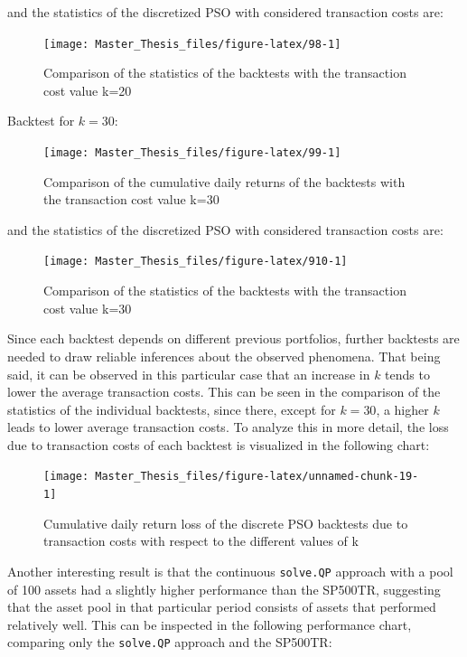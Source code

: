 \documentclass[
  oneside, a4paper, 12pt, openany]{book}
\theoremstyle{definition}
\theoremstyle{definition}
\theoremstyle{definition}
\theoremstyle{definition}
\theoremstyle{remark}
\begin{document}
and the statistics of the discretized PSO with considered transaction costs are:

\begin{figure}[H]
\texttt{[image: Master\_Thesis\_files/figure-latex/98-1]} \caption{Comparison of the statistics of the backtests with the transaction cost value k=20}\label{fig:98}
\end{figure}

Backtest for \(k=30\):

\begin{figure}[H]
\texttt{[image: Master\_Thesis\_files/figure-latex/99-1]} \caption{Comparison of the cumulative daily returns of the backtests with the transaction cost value k=30}\label{fig:99}
\end{figure}

and the statistics of the discretized PSO with considered transaction costs are:

\begin{figure}[H]
\texttt{[image: Master\_Thesis\_files/figure-latex/910-1]} \caption{Comparison of the statistics of the backtests with the transaction cost value k=30}\label{fig:910}
\end{figure}

Since each backtest depends on different previous portfolios, further backtests are needed to draw reliable inferences about the observed phenomena. That being said, it can be observed in this particular case that an increase in \(k\) tends to lower the average transaction costs. This can be seen in the comparison of the statistics of the individual backtests, since there, except for \(k=30\), a higher \(k\) leads to lower average transaction costs. To analyze this in more detail, the loss due to transaction costs of each backtest is visualized in the following chart:

\begin{figure}[H]
\texttt{[image: Master\_Thesis\_files/figure-latex/unnamed-chunk-19-1]} \caption{Cumulative daily return loss of the discrete PSO backtests due to transaction costs with respect to the different values of k}\label{fig:unnamed-chunk-19}
\end{figure}

Another interesting result is that the continuous \texttt{solve.QP} approach with a pool of 100 assets had a slightly higher performance than the SP500TR, suggesting that the asset pool in that particular period consists of assets that performed relatively well. This can be inspected in the following performance chart, comparing only the \texttt{solve.QP} approach and the SP500TR:
\end{document}
